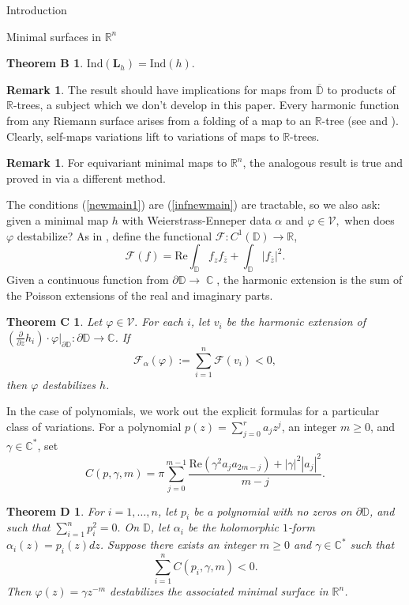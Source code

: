 \documentclass[10pt]{amsart}
\newcommand{\R}{\mathbb R}
\newtheorem*{thmb}{Theorem B}
\newtheorem*{thmc}{Theorem C}
\newtheorem*{thmd}{Theorem D}
\DeclareMathOperator{\C}{\mathbb{C}}
\theoremstyle{definition}
\newtheorem{remark}[thm]{Remark}
\begin{document}
\begin{section}{Introduction}
\begin{subsection}{Minimal surfaces in $\R^n$}
\begin{thmb} $\textrm{Ind}(\mathbf{L}_h)=\textrm{Ind}(h).$
\end{thmb}
\begin{remark}
    The result should have implications for maps from $\overline{\mathbb{D}}$ to products of $\R$-trees, a subject which we don't develop in this paper. Every harmonic function from any Riemann surface arises from a folding of a map to an $\R$-tree (see \cite{FW} and \cite[Section 4.1]{MSS}). Clearly, self-maps variations lift to variations of maps to $\R$-trees.
\end{remark}
\begin{remark}
For equivariant minimal maps to $\R^n$, the analogous result is true and proved in \cite[Lemma 4.6 and Proposition 4.8]{MSS} via a different method. 
\end{remark}
The conditions (\ref{newmain1}) are (\ref{infnewmain}) are tractable, so we also ask: given a minimal map $h$ with Weierstrass-Enneper data $\alpha$ and $\varphi\in \mathcal{V},$ when does $\varphi$ destabilize?
As in \cite[Section 5]{M2}, define the functional $\mathcal{F}: C^1(\mathbb{D})\to \R$, $$\mathcal{F}(f) = \textrm{Re}\int_{\mathbb{D}}f_zf_{\overline{z}}+\int_{\mathbb{D}}|f_{\overline{z}}|^2.$$ Given a continuous function from $\partial\mathbb{D}\to\C$, the harmonic extension is the sum of the Poisson extensions of the real and imaginary parts.
\begin{thmc}
Let $\varphi\in \mathcal{V}.$ For each $i$, let $v_i$ be the harmonic extension of $(\frac{\partial}{\partial z}h_i)\cdot \varphi|_{\partial \mathbb{D}}:\partial \mathbb{D}\to\mathbb{C}$. If $$\mathcal{F}_\alpha(\varphi) := \sum_{i=1}^n \mathcal{F}(v_i)<0,$$ then $\varphi$ destabilizes $h$.
\end{thmc}
In the case of polynomials, we work out the explicit formulas for a particular class of variations. For a polynomial $p(z)=\sum_{j=0}^r a_jz^j$, an integer $m\geq 0$, and $\gamma\in\mathbb{C}^*$, set  
$$ C(p,\gamma,m) =\pi\sum_{j=0}^{m-1}\frac{\textrm{Re}(\gamma^2a_ja_{2m-j})+|\gamma|^2|a_j|^2}{m-j}.$$
\begin{thmd}
 For $i=1,\dots, n$, let $p_i$ be a polynomial with no zeros on $\partial\mathbb{D}$, and such that $\sum_{i=1}^np_i^2 = 0.$ On $\mathbb{D}$, let $\alpha_i$ be the holomorphic $1$-form $\alpha_i(z)=p_i(z)dz$. Suppose there exists an integer $m\geq 0$ and $\gamma\in \mathbb{C}^*$ such that $$\sum_{i=1}^n C(p_i,\gamma,m) < 0.$$
Then $\varphi(z)=\gamma z^{-m}$ destabilizes the associated minimal surface in $\R^n$.

\end{thmd}
\end{subsection}
\end{section}
\end{document}
